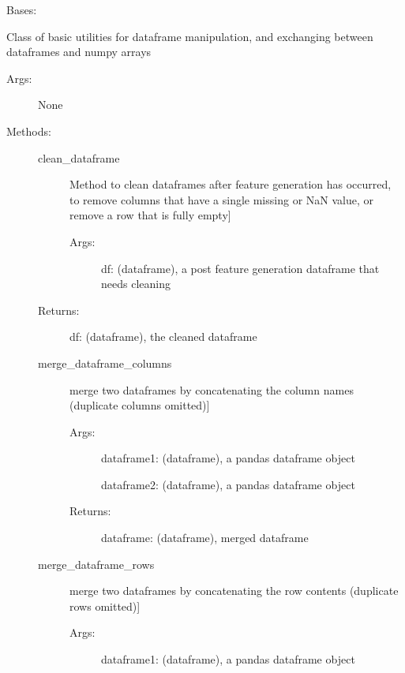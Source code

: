 \documentclass[letterpaper,10pt,english]{sphinxmanual}
\begin{document}
\begin{fulllineitems}
\label{\detokenize{api/mastml.feature_generators.DataframeUtilities:mastml.feature_generators.DataframeUtilities}}
Bases: 

Class of basic utilities for dataframe manipulation, and exchanging between dataframes and numpy arrays
\begin{description}
\item[{Args:}] \leavevmode
None

\item[{Methods:}] \leavevmode\begin{description}
\item[{clean\_dataframe}] \leavevmode{[}Method to clean dataframes after feature generation has occurred, to remove columns that have a single missing or NaN value, or remove a row that is fully empty{]}\begin{description}
\item[{Args:}] \leavevmode
df: (dataframe), a post feature generation dataframe that needs cleaning

\end{description}

\item[{Returns:}] \leavevmode
df: (dataframe), the cleaned dataframe

\item[{merge\_dataframe\_columns}] \leavevmode{[}merge two dataframes by concatenating the column names (duplicate columns omitted){]}\begin{description}
\item[{Args:}] \leavevmode
dataframe1: (dataframe), a pandas dataframe object

dataframe2: (dataframe), a pandas dataframe object

\item[{Returns:}] \leavevmode
dataframe: (dataframe), merged dataframe

\end{description}

\item[{merge\_dataframe\_rows}] \leavevmode{[}merge two dataframes by concatenating the row contents (duplicate rows omitted){]}\begin{description}
\item[{Args:}] \leavevmode
dataframe1: (dataframe), a pandas dataframe object


\end{description}
\end{description}
\end{description}
\end{fulllineitems}
\end{document}
